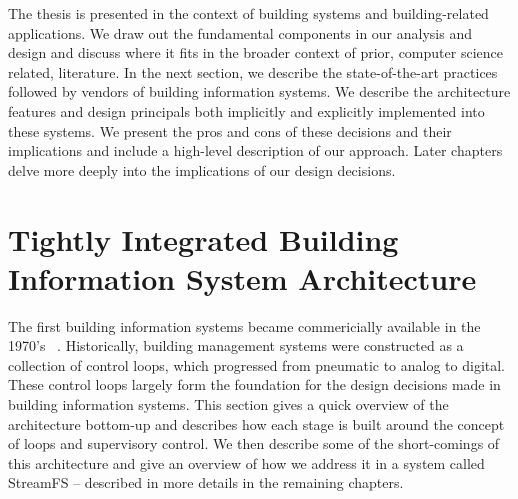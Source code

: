 The thesis is presented in the context of building systems and building-related applications.  We draw out the fundamental 
components in our analysis and design and discuss where it fits in the broader context of prior, computer science related,
literature.  In the next section, we describe the state-of-the-art practices followed by vendors of building information systems.
We describe the architecture features and design principals both implicitly and explicitly implemented into these systems.
We present the pros and cons of these decisions and their implications and include a high-level description of our approach.
Later chapters delve more deeply into the implications of our design decisions.

\section{Tightly Integrated Building Information System Architecture}


The first building information systems became commericially available in the 1970's ~\cite{gardner1987energy}.  
Historically, building management 
systems were constructed as a collection of control loops, which progressed from pneumatic to analog to digital.
These control loops largely form the foundation for the design decisions made in building information systems.  
This section gives a quick overview of the architecture bottom-up and describes how each stage is built around
the concept of loops and supervisory control.  We then describe some of the short-comings of this architecture
and give an overview of how we address it in a system called StreamFS -- described in more details in
the remaining chapters.

